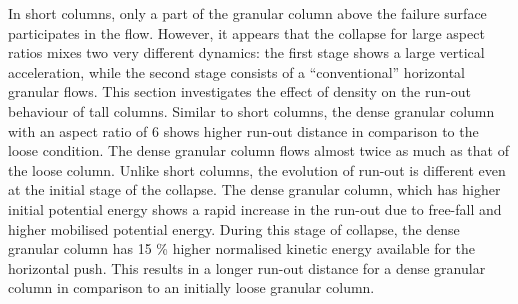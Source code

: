 In short columns, only a part of the granular column above the failure surface 
participates in the flow. However, it appears that the collapse for 
large aspect ratios mixes two very different dynamics: the first stage 
shows a large vertical acceleration, while the second stage 
consists of a ``conventional'' horizontal granular flows. This section 
investigates the effect of density 
on the run-out behaviour of tall columns. Similar to short 
columns, the dense granular column with an aspect ratio of 6 shows higher 
run-out distance in comparison to the loose condition. The dense granular 
column flows almost twice as much as that of the loose column. Unlike short 
columns, the evolution of run-out is different even at the initial stage of the 
collapse. The dense granular column, which has higher initial potential energy 
shows a rapid increase in the run-out due to free-fall and higher mobilised 
potential energy. During this stage of collapse, the dense granular column has 
15 \% higher normalised kinetic energy available for the horizontal push. This 
results in a longer run-out distance for a dense granular column in comparison 
to an initially loose granular column.

